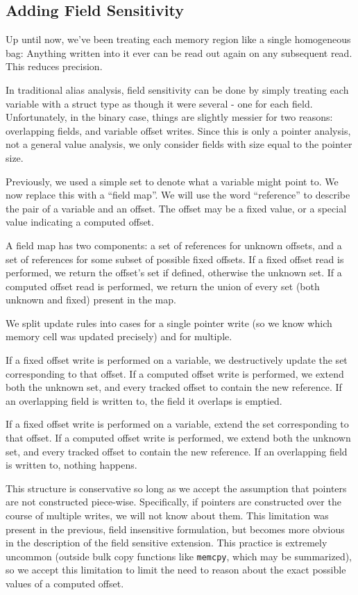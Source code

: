 \subsection{Adding Field Sensitivity}
\label{sec:field}
Up until now, we've been treating each memory region like a single homogeneous bag:
Anything written into it ever can be read out again on any subsequent read.
This reduces precision.

In traditional alias analysis, field sensitivity can be done by simply treating each variable with a struct type as though it were several - one for each field.
Unfortunately, in the binary case, things are slightly messier for two reasons: overlapping fields, and variable offset writes.
Since this is only a pointer analysis, not a general value analysis, we only consider fields with size equal to the pointer size.

Previously, we used a simple set to denote what a variable might point to.
We now replace this with a ``field map''.
We will use the word ``reference'' to describe the pair of a variable and an offset.
The offset may be a fixed value, or a special value indicating a computed offset.

A field map has two components: a set of references for unknown offsets, and a set of references for some subset of possible fixed offsets.
If a fixed offset read is performed, we return the offset's set if defined, otherwise the unknown set.
If a computed offset read is performed, we return the union of every set (both unknown and fixed) present in the map.

We split update rules into cases for a single pointer write (so we know which memory cell was updated precisely) and for multiple.

If a fixed offset write is performed on a variable, we destructively update the set corresponding to that offset.
If a computed offset write is performed, we extend both the unknown set, and every tracked offset to contain the new reference.
If an overlapping field is written to, the field it overlaps is emptied.

If a fixed offset write is performed on a variable, extend the set corresponding to that offset.
If a computed offset write is performed, we extend both the unknown set, and every tracked offset to contain the new reference.
If an overlapping field is written to, nothing happens.

This structure is conservative so long as we accept the assumption that pointers are not constructed piece-wise.
Specifically, if pointers are constructed over the course of multiple writes, we will not know about them.
This limitation was present in the previous, field insensitive formulation, but becomes more obvious in the description of the field sensitive extension.
This practice is extremely uncommon (outside bulk copy functions like \texttt{memcpy}, which may be summarized), so we accept this limitation to limit the need to reason about the exact possible values of a computed offset.

